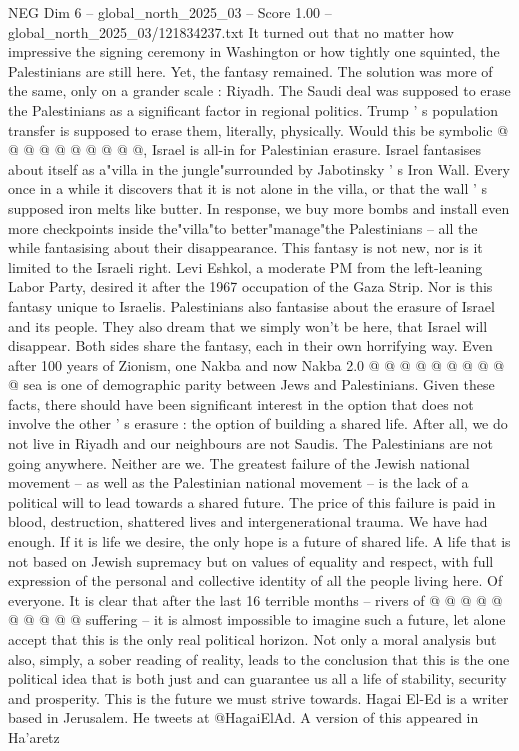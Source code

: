 \begin{textsample}{NEG Dim 6 – global\_north\_2025\_03 – Score 1.00 – global\_north\_2025\_03/121834237.txt}
It turned out that no matter how impressive the signing ceremony in Washington or how tightly one squinted, the Palestinians are still here.
Yet, the fantasy remained.
The solution was more of the same, only on a grander scale : Riyadh.
The Saudi deal was supposed to erase the Palestinians as a significant factor in regional politics.
Trump ' s population transfer is supposed to erase them, literally, physically.
Would this be symbolic @ @ @ @ @ @ @ @ @ @, Israel is all-in for Palestinian erasure.
Israel fantasises about itself as a"villa in the jungle"surrounded by Jabotinsky ' s Iron Wall.
Every once in a while it discovers that it is not alone in the villa, or that the wall ' s supposed iron melts like butter.
In response, we buy more bombs and install even more checkpoints inside the"villa"to better"manage"the Palestinians -- all the while fantasising about their disappearance.
This fantasy is not new, nor is it limited to the Israeli right.
Levi Eshkol, a moderate PM from the left-leaning Labor Party, desired it after the 1967 occupation of the Gaza Strip.
Nor is this fantasy unique to Israelis.
Palestinians also fantasise about the erasure of Israel and its people.
They also dream that we simply won't be here, that Israel will disappear.
Both sides share the fantasy, each in their own horrifying way.
Even after 100 years of Zionism, one Nakba and now Nakba 2.0 @ @ @ @ @ @ @ @ @ @ sea is one of demographic parity between Jews and Palestinians.
Given these facts, there should have been significant interest in the option that does not involve the other ' s erasure : the option of building a shared life.
After all, we do not live in Riyadh and our neighbours are not Saudis.
The Palestinians are not going anywhere.
Neither are we.
The greatest failure of the Jewish national movement -- as well as the Palestinian national movement -- is the lack of a political will to lead towards a shared future.
The price of this failure is paid in blood, destruction, shattered lives and intergenerational trauma.
We have had enough.
If it is life we desire, the only hope is a future of shared life.
A life that is not based on Jewish supremacy but on values of equality and respect, with full expression of the personal and collective identity of all the people living here.
Of everyone.
It is clear that after the last 16 terrible months -- rivers of @ @ @ @ @ @ @ @ @ @ suffering -- it is almost impossible to imagine such a future, let alone accept that this is the only real political horizon.
Not only a moral analysis but also, simply, a sober reading of reality, leads to the conclusion that this is the one political idea that is both just and can guarantee us all a life of stability, security and prosperity.
This is the future we must strive towards.
Hagai El-Ed is a writer based in Jerusalem.
He tweets at @HagaiElAd.
A version of this appeared in Ha'aretz

\end{textsample}
